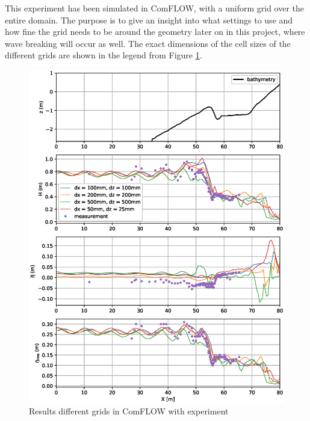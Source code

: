 This experiment has been simulated in ComFLOW, with a uniform grid over the entire domain. The purpose is to give an insight into what settings to use and how fine the grid needs to be around the geometry later on in this project, where wave breaking will occur as well. The exact dimensions of the cell sizes of the different grids are shown in the legend from Figure \ref{fig:breakerbarexperiment}. 




\begin{figure}[H]
    \centering
    \includegraphics[width=0.8\linewidth]{figures/Validation/plot_stats_compare_H-1.eps}
    \caption{Results different grids in ComFLOW with experiment \citep{breakerbarexperiment}}
    \label{fig:breakerbarexperiment}
\end{figure}


